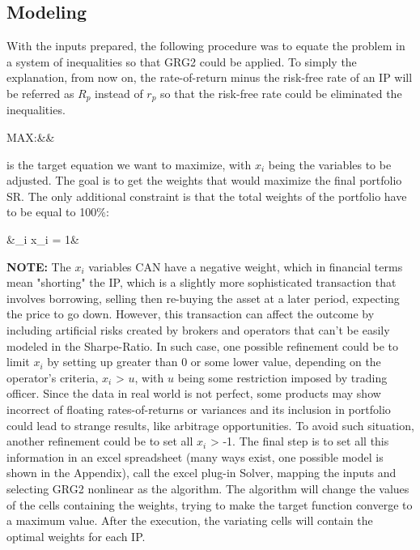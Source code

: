 \documentclass[a4paper,man,natbib]{apa6}
\begin{document}
	\subsection{Modeling}
	With the inputs prepared, the following procedure was to equate the problem in a system of inequalities so that GRG2 could be applied. To simply the explanation, from now on, the rate-of-return minus the risk-free rate of an IP will be referred as $R_p$ instead of $r_p$ so that the risk-free rate could be eliminated the inequalities.
	\begin{flalign}
	MAX:&&
	\end{flalign}
	is the target equation we want to maximize, with $x_i$ being the variables to be adjusted.
	The goal is to get the weights that would maximize the final portfolio SR. The only additional constraint is that the total weights of the portfolio have to be equal to 100\%:
	\begin{flalign}
	&\sum_i x_i = 1&
	\end{flalign}
	\textbf{NOTE:} The $x_i$ variables CAN have a negative weight, which in financial terms mean "shorting" the IP, which is a slightly more sophisticated transaction that involves borrowing, selling then re-buying the asset at a later period, expecting the price to go down. However, this transaction can affect the outcome by including artificial risks created by brokers and operators that can't be easily modeled in the Sharpe-Ratio. In such case, one possible refinement could be to limit $x_i$ by setting up greater than 0 or some lower value, depending on the operator's criteria, $x_i$ > $u$, with $u$ being some restriction imposed by trading officer.
	Since the data in real world is not perfect, some products may show incorrect of floating rates-of-returns or variances and its inclusion in portfolio could lead to strange results, like arbitrage opportunities. To avoid such situation, another refinement could be to set all $x_i$ > -1.
	The final step is to set all this information in an excel spreadsheet (many ways exist, one possible model is shown in the Appendix), call the excel plug-in Solver, mapping the inputs and selecting GRG2 nonlinear as the algorithm. The algorithm will change the values of the cells containing the weights, trying to make the target function converge to a maximum value. After the execution, the variating cells will contain the optimal weights for each IP.
	
\end{document}
